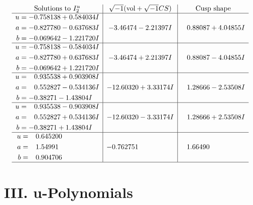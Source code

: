 \documentclass[1p]{elsarticle_modified}
\theoremstyle{definition}
\newcommand{\I}{\sqrt{-1}}
\begin{document}
$$\begin{array}{c|c|c}  
\text{Solutions to }I^u_{2}& \I (\text{vol} + \sqrt{-1}CS) & \text{Cusp shape}\\
 \hline 
\begin{aligned}
u &= -0.758138 + 0.584034 I \\
a &= -0.827780 - 0.637683 I \\
b &= -0.069642 - 1.221720 I\end{aligned}
 & -3.46474 - 2.21397 I & \phantom{-}0.88087 + 4.04855 I \\ \hline\begin{aligned}
u &= -0.758138 - 0.584034 I \\
a &= -0.827780 + 0.637683 I \\
b &= -0.069642 + 1.221720 I\end{aligned}
 & -3.46474 + 2.21397 I & \phantom{-}0.88087 - 4.04855 I \\ \hline\begin{aligned}
u &= \phantom{-}0.935538 + 0.903908 I \\
a &= \phantom{-}0.552827 - 0.534136 I \\
b &= -0.38271 - 1.43804 I\end{aligned}
 & -12.60320 + 3.33174 I & \phantom{-}1.28666 - 2.53508 I \\ \hline\begin{aligned}
u &= \phantom{-}0.935538 - 0.903908 I \\
a &= \phantom{-}0.552827 + 0.534136 I \\
b &= -0.38271 + 1.43804 I\end{aligned}
 & -12.60320 - 3.33174 I & \phantom{-}1.28666 + 2.53508 I \\ \hline\begin{aligned}
u &= \phantom{-}0.645200\phantom{ +0.000000I} \\
a &= \phantom{-}1.54991\phantom{ +0.000000I} \\
b &= \phantom{-}0.904706\phantom{ +0.000000I}\end{aligned}
 & -0.762751\phantom{ +0.000000I} & \phantom{-}1.66490\phantom{ +0.000000I}\\
 \hline 
 \end{array}$$\newpage
\newpage\renewcommand{\arraystretch}{1}
\centering \section*{ III. u-Polynomials}
\end{document}
